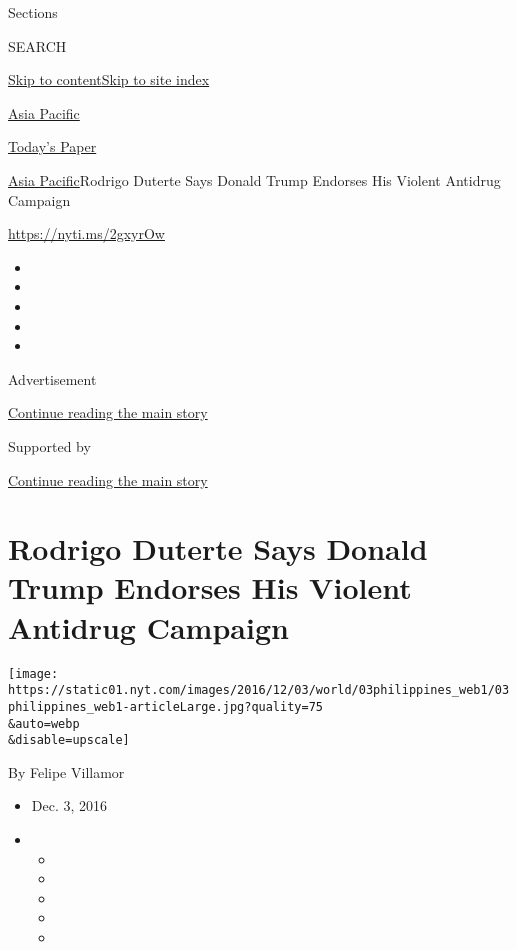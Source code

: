 Sections

SEARCH

\protect\hyperlink{site-content}{Skip to
content}\protect\hyperlink{site-index}{Skip to site index}

\href{https://www.nytimes.com/section/world/asia}{Asia Pacific}

\href{https://myaccount.nytimes.com/auth/login?response_type=cookie\&client_id=vi}{}

\href{https://www.nytimes.com/section/todayspaper}{Today's Paper}

\href{/section/world/asia}{Asia Pacific}\textbar{}Rodrigo Duterte Says
Donald Trump Endorses His Violent Antidrug Campaign

\url{https://nyti.ms/2gxyrOw}

\begin{itemize}
\item
\item
\item
\item
\item
\end{itemize}

Advertisement

\protect\hyperlink{after-top}{Continue reading the main story}

Supported by

\protect\hyperlink{after-sponsor}{Continue reading the main story}

\hypertarget{rodrigo-duterte-says-donald-trump-endorses-his-violent-antidrug-campaign}{%
\section{Rodrigo Duterte Says Donald Trump Endorses His Violent Antidrug
Campaign}\label{rodrigo-duterte-says-donald-trump-endorses-his-violent-antidrug-campaign}}

\texttt{[image: https://static01.nyt.com/images/2016/12/03/world/03philippines\_web1/03philippines\_web1-articleLarge.jpg?quality=75\\\&auto=webp\\\&disable=upscale]}

By Felipe Villamor

\begin{itemize}
\item
  Dec. 3, 2016
\item
  \begin{itemize}
  \item
  \item
  \item
  \item
  \item
  \end{itemize}
\end{itemize}

